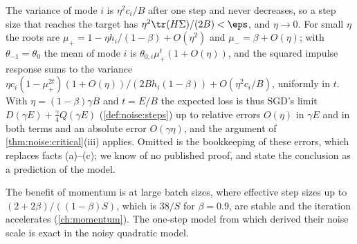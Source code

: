 \begin{refsection}
\begin{proofsketch}
The variance of mode $i$ is $\eta^2c_i/B$ after one step and never decreases, so a step size that reaches the target has $\eta^2\tr(H\Sigma)/(2B)<\eps$, and $\eta\to0$. For small $\eta$ the roots are $\mu_+=1-\eta h_i/(1-\beta)+O(\eta^2)$ and $\mu_-=\beta+O(\eta)$; with $\theta_{-1}=\theta_0$ the mean of mode $i$ is $\theta_{0,i}\mu_+^t(1+O(\eta))$, and the squared impulse response sums to the variance $\eta c_i(1-\mu_+^{2t})(1+O(\eta))/(2Bh_i(1-\beta))+O(\eta^2c_i/B)$, uniformly in $t$. With $\eta=(1-\beta)\gamma B$ and $t=E/B$ the expected loss is thus SGD's limit $D(\gamma E)+\frac\gamma4Q(\gamma E)$ (\cref{def:noise:steps}) up to relative errors $O(\eta)$ in $\gamma E$ and in both terms and an absolute error $O(\gamma\eta)$, and the argument of \cref{thm:noise:critical}(iii) applies. Omitted is the bookkeeping of these errors, which replaces facts (a)--(c); we know of no published proof, and \textcite{ZhangEtAl2019NQM} state the conclusion as a prediction of the model.
\end{proofsketch}

The benefit of momentum is at large batch sizes, where effective step sizes up to $(2+2\beta)/((1-\beta)S)$, which is $38/S$ for $\beta=0.9$, are stable and the iteration accelerates (\cref{ch:momentum}). The one-step model from which \textcite{McCandlishEtAl2018} derived their noise scale is exact in the noisy quadratic model.



\end{refsection}
